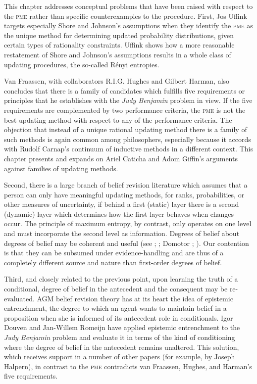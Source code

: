 \documentclass[11pt]{article}
\begin{document}
This chapter addresses conceptual problems that have been raised with
respect to the \textsc{pme} rather than specific counterexamples to
the procedure. First, Jos Uffink targets especially Shore and
Johnson's assumptions when they identify the \textsc{pme} as the
unique method for determining updated probability distributions, given
certain types of rationality constraints. Uffink shows how a more
reasonable restatement of Shore and Johnson's assumptions results in a
whole class of updating procedures, the so-called R{\'e}nyi entropies.

Van Fraassen, with collaborators R.I.G. Hughes and Gilbert Harman,
also concludes that there is a family of candidates which fulfills
five requirements or principles that he establishes with the
\emph{Judy Benjamin} problem in view. If the five requirements are
complemented by two performance criteria, the \textsc{pme} is not the
best updating method with respect to any of the performance criteria.
The objection that instead of a unique rational updating method there
is a family of such methods is again common among philosophers,
especially because it accords with Rudolf Carnap's continuum of
inductive methods in a different context. This chapter presents and
expands on Ariel Caticha and Adom Giffin's arguments against families
of updating methods.

Second, there is a large branch of belief revision literature which
assumes that a person can only have meaningful updating methods, for
ranks, probabilities, or other measures of uncertainty, if behind a
first (static) layer there is a second (dynamic) layer which
determines how the first layer behaves when changes occur. The
principle of maximum entropy, by contrast, only operates on one level
and must incorporate the second level as information. Degrees of
belief about degrees of belief may be coherent and useful (see
; ; Domotor
; ). Our contention is
that they can be subsumed under evidence-handling and are thus of a
completely different source and nature than first-order degrees of
belief.

Third, and closely related to the previous point, upon learning the
truth of a conditional, degree of belief in the antecedent and the
consequent may be re-evaluated. AGM belief revision theory has at its
heart the idea of epistemic entrenchment, the degree to which an agent
wants to maintain belief in a proposition when she is informed of its
antecedent role in conditionals. Igor Douven and Jan-Willem Romeijn
have applied epistemic entrenchment to the \emph{Judy Benjamin}
problem and evaluate it in terms of  the
kind of conditioning where the degree of belief in the antecedent
remains unaltered. This solution, which receives support in a number
of other papers (for example, by Joseph Halpern), in contrast to the
\textsc{pme} contradicts van Fraassen, Hughes, and Harman's five
requirements.
\end{document}

